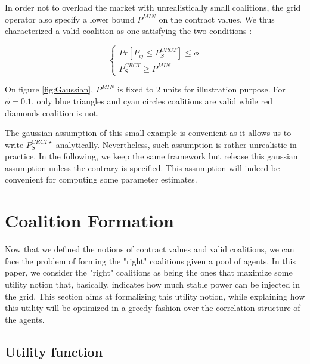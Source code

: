 \documentclass[conference]{IEEEtran}
\begin{document}
In order not to overload the market with unrealistically small coalitions, the grid operator also specify a lower bound $ P^{MIN} $ on the contract values. We thus characterized a valid coalition as one satisfying the two conditions :

\begin{equation}
\left\{ \begin{array}{lll}
			Pr[P_{ij} \leq P_{S}^{CRCT}] \leq \phi \\
			P_{S}^{CRCT} \geq P^{MIN}
\end{array} \right.
\end{equation}

On figure \ref{fig:Gaussian}, $ P^{MIN} $ is fixed to 2 units for illustration purpose. For $ \phi = 0.1 $, only blue triangles and cyan circles coalitions are valid while red diamonds coalition is not.

The gaussian assumption of this small example is convenient as it allows us to write $ P_{S}^{CRCT \star} $ analytically. Nevertheless, such assumption is rather unrealistic in practice. In the following, we keep the same framework but release this gaussian assumption unless the contrary is specified. This assumption will indeed be convenient for computing some parameter estimates.

%
%

\section{Coalition Formation}
\label{sec:forming}

Now that we defined the notions of contract values and valid coalitions, we can face the problem of forming the "right" coalitions given a pool of agents. In this paper, we consider the "right" coalitions as being the ones that maximize some utility notion that, basically, indicates how much stable power can be injected in the grid. This section aims at formalizing this utility notion, while explaining how this utility will be optimized in a greedy fashion over the correlation structure of the agents. 


\subsection{Utility function}
\end{document}
